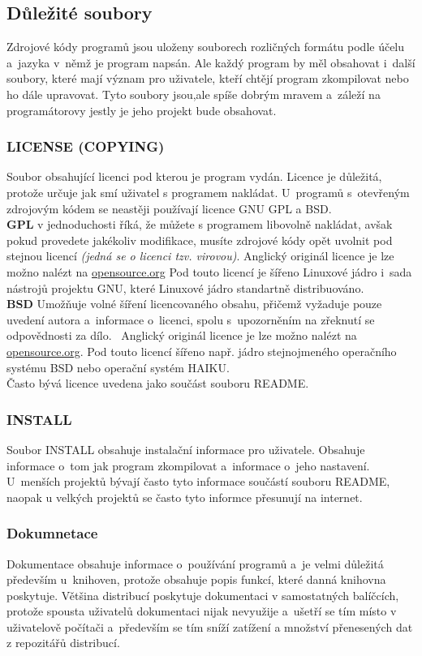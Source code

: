 \documentclass[a4paper,12pt]{article}
\renewcommand{\b}[1]{\textbf{#1}} %
\renewcommand{\it}[1]{\textit{#1}}		%
\begin{document}
\subsection{Důležité soubory}
Zdrojové kódy programů jsou uloženy souborech rozličných formátu podle účelu a~jazyka v~němž je program napsán. Ale každý program by měl obsahovat i~další soubory, které mají význam pro uživatele, kteří chtějí program zkompilovat nebo ho dále upravovat. Tyto soubory jsou,ale spíše dobrým mravem a~záleží na programátorovy jestly je jeho projekt bude obsahovat.
\subsubsection{LICENSE (COPYING)}
Soubor obsahující licenci pod kterou je program vydán. Licence je důležitá, protože určuje jak smí uživatel s programem nakládat. U~programů s~otevřeným zdrojovým kódem se neastěji používají licence GNU GPL a BSD.\\ \b{GPL} v jednoduchosti říká, že můžete s programem libovolně nakládat, avšak pokud provedete jakékoliv modifikace, musíte zdrojové kódy opět uvolnit pod stejnou licencí \it{(jedná se o licenci tzv. virovou)}. Anglický originál licence je lze možno nalézt na \href{http://www.opensource.org/licenses/gpl-3.0}{opensource.org} Pod touto licencí je šířeno Linuxové jádro i~sada nástrojů projektu GNU, které Linuxové jádro standartně distribuováno.\\ \b{BSD} Umožňuje volné šíření licencovaného obsahu, přičemž vyžaduje pouze uvedení autora a~informace o~licenci, spolu s~upozorněním na zřeknutí se odpovědnosti za dílo.~\cite{BSDL} Anglický originál licence je lze možno nalézt na \href{http://www.opensource.org/licenses/bsd-license.php}{opensource.org}. Pod touto licencí šířeno např. jádro stejnojmeného operačního systému BSD nebo operační systém HAIKU.\\
Často bývá licence uvedena jako součást souboru README.
\subsubsection{INSTALL}
Soubor INSTALL obsahuje instalační informace pro uživatele. Obsahuje informace o~tom jak program zkompilovat a~informace o~jeho nastavení. U~menších projektů bývají často tyto informace součástí souboru README, naopak u velkých projektů se často tyto informce přesunují na internet.
\subsubsection{Dokumnetace}
Dokumentace obsahuje informace o~používání programů a~je velmi důležitá především u~knihoven, protože obsahuje popis funkcí, které danná knihovna poskytuje. Většina distribucí poskytuje dokumentaci v samostatných balíčcích, protože spousta uživatelů dokumentaci nijak nevyužije a~ušetří se tím místo v uživatelově počítači a~především se tím sníží zatížení a množství přenesených dat z repozitářů distribucí.
\end{document}
